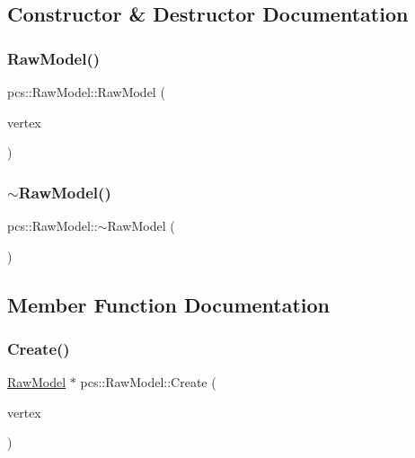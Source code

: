 \subsection{Constructor \& Destructor Documentation}
\mbox{\label{classpcs_1_1RawModel_addb04fed9a364e9c24b8b4f4b69480a7}} 
\subsubsection{\texorpdfstring{Raw\+Model()}{RawModel()}}
{\footnotesize\ttfamily pcs\+::\+Raw\+Model\+::\+Raw\+Model (\begin{DoxyParamCaption}\item[{const \hyperlink{classpcs_1_1VertexArray}{Vertex\+Array} \&}]{vertex }\end{DoxyParamCaption})\hspace{0.3cm}{\ttfamily [private]}}

\mbox{\label{classpcs_1_1RawModel_a3fb7c140b100311f737d23dfb9fbf6d6}} 
\subsubsection{\texorpdfstring{$\sim$\+Raw\+Model()}{~RawModel()}}
{\footnotesize\ttfamily pcs\+::\+Raw\+Model\+::$\sim$\+Raw\+Model (\begin{DoxyParamCaption}{ }\end{DoxyParamCaption})}



\subsection{Member Function Documentation}
\mbox{\label{classpcs_1_1RawModel_ac01c81a6c26c802f17a65f6c81147206}} 
\subsubsection{\texorpdfstring{Create()}{Create()}}
{\footnotesize\ttfamily \hyperlink{classpcs_1_1RawModel}{Raw\+Model} $\ast$ pcs\+::\+Raw\+Model\+::\+Create (\begin{DoxyParamCaption}\item[{const \hyperlink{classpcs_1_1VertexArray}{Vertex\+Array} \&}]{vertex }\end{DoxyParamCaption})\hspace{0.3cm}{\ttfamily [static]}}

